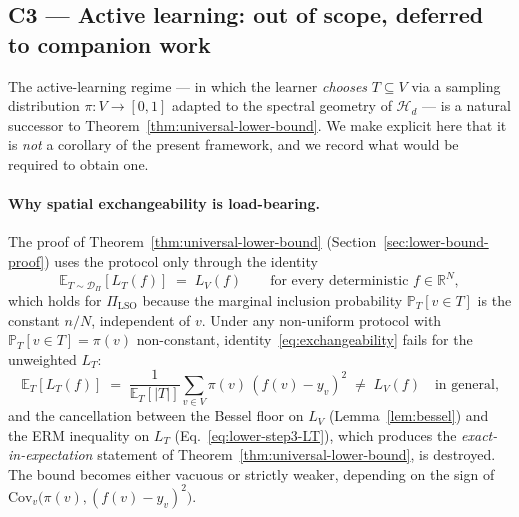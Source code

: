 \documentclass[11pt,a4paper]{article}
\theoremstyle{plain}
\theoremstyle{definition}
\theoremstyle{remark}
\newcommand{\E}{\mathbb{E}}
\newcommand{\R}{\mathbb{R}}
\newcommand{\PR}{\mathbb{P}}
\newcommand{\Cov}{\mathrm{Cov}}
\newcommand{\Hcal}{\mathcal{H}}
\newcommand{\Dcal}{\mathcal{D}}
\begin{document}
\subsection{C3 --- Active learning: out of scope, deferred to companion work}
\label{subsec:c3}

The active-learning regime --- in which the learner \emph{chooses}
$T \subseteq V$ via a sampling distribution $\pi : V \to [0,1]$
adapted to the spectral geometry of $\Hcal_d$
\citep{Settles2009,Hanneke2014,GuilloryBilmes2009,GaddeAnisOrtega2014,DrineasMahoney2018,Avron2017,Puy2018}
--- is a natural successor to Theorem~\ref{thm:universal-lower-bound}.
We make explicit here that it is \emph{not} a corollary of the present
framework, and we record what would be required to obtain one.

\paragraph{Why spatial exchangeability is load-bearing.}
The proof of Theorem~\ref{thm:universal-lower-bound}
(Section~\ref{sec:lower-bound-proof}) uses the protocol only through
the identity
\begin{equation}
    \E_{T \sim \Dcal_\Pi}[L_T(f)] \;=\; L_V(f) \qquad
    \text{for every deterministic } f \in \R^N,
    \label{eq:exchangeability}
\end{equation}
which holds for $\Pi_{\mathrm{LSO}}$ because the marginal inclusion
probability $\PR_T[v \in T]$ is the constant $n/N$, independent of
$v$. Under any non-uniform protocol with $\PR_T[v \in T] = \pi(v)$
non-constant, identity~\eqref{eq:exchangeability} fails for the
unweighted $L_T$:
\begin{equation*}
    \E_T[L_T(f)] \;=\; \frac{1}{\E_T[|T|]} \sum_{v \in V} \pi(v)\,(f(v) - y_v)^2
    \;\neq\; L_V(f) \quad \text{in general,}
\end{equation*}
and the cancellation between the Bessel floor on $L_V$
(Lemma~\ref{lem:bessel}) and the ERM inequality on $L_T$
(Eq.~\eqref{eq:lower-step3-LT}), which produces the
\emph{exact-in-expectation} statement of
Theorem~\ref{thm:universal-lower-bound}, is destroyed. The bound
becomes either vacuous or strictly weaker, depending on the sign of
$\Cov_v\!\big(\pi(v), (f(v) - y_v)^2\big)$.
\end{document}
